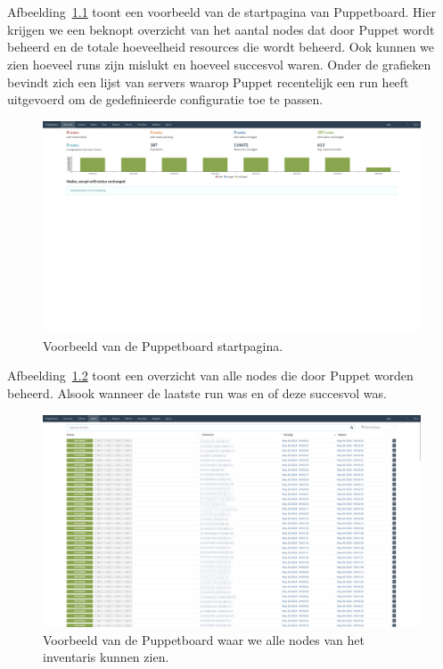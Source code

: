 
\chapter{}%
\label{ch:bijlage_puppetboard}

Afbeelding~\ref{fig:puppetboard-home} toont een voorbeeld van de startpagina van Puppetboard.
Hier krijgen we een beknopt overzicht van het aantal nodes dat door Puppet wordt beheerd en de totale hoeveelheid resources die wordt beheerd.
Ook kunnen we zien hoeveel runs zijn mislukt en hoeveel succesvol waren.
Onder de grafieken bevindt zich een lijst van servers waarop Puppet recentelijk een run heeft uitgevoerd om de gedefinieerde configuratie toe te passen.

\begin{figure}[h!]
    \includegraphics[width=\textwidth]
    {./graphics/state-of-the-art/puppetboard/puppetboard-home.png}
    \caption{\label{fig:puppetboard-home}Voorbeeld van de Puppetboard startpagina.}
\end{figure}

Afbeelding~\ref{fig:puppetboard-inventory} toont een overzicht van alle nodes die door Puppet worden beheerd.
Alsook wanneer de laatste run was en of deze succesvol was.

\begin{figure}[h!]
    \includegraphics[width=\textwidth]
    {./graphics/state-of-the-art/puppetboard/puppetboard-hosts.png}
    \caption{\label{fig:puppetboard-inventory}Voorbeeld van de Puppetboard waar we alle nodes van het inventaris kunnen zien.}
\end{figure}

